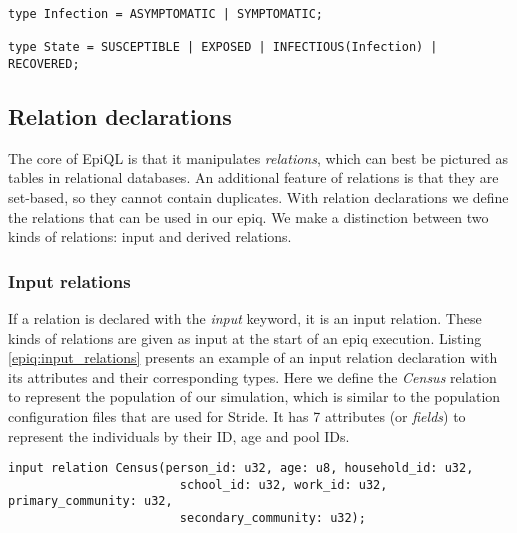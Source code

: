 \begin{lstlisting}[caption={User-defined enumerated types.}, label={epiq:enumerated_types}]
type Infection = ASYMPTOMATIC | SYMPTOMATIC;

type State = SUSCEPTIBLE | EXPOSED | INFECTIOUS(Infection) | RECOVERED;
\end{lstlisting}

\subsection{Relation declarations}
\label{subsec:relation_declarations}
The core of EpiQL is that it manipulates \textit{relations}, which can best be pictured as tables in relational databases. An additional feature of relations is that they are set-based, so they cannot contain duplicates. With relation declarations we define the relations that can be used in our epiq. We make a distinction between two kinds of relations: input and derived relations.

\subsubsection{Input relations}
If a relation is declared with the \textit{input} keyword, it is an input relation. These kinds of relations are given as input at the start of an epiq execution. Listing \ref{epiq:input_relations} presents an example of an input relation declaration with its attributes and their corresponding types. Here we define the \textit{Census} relation to represent the population of our simulation, which is similar to the population configuration files that are used for Stride. It has 7 attributes (or \textit{fields}) to represent the individuals by their ID, age and pool IDs.

\begin{lstlisting}[caption={Input relation declaration.}, label={epiq:input_relations}]
input relation Census(person_id: u32, age: u8, household_id: u32, 	
					    school_id: u32, work_id: u32, primary_community: u32, 
					    secondary_community: u32);
\end{lstlisting}

